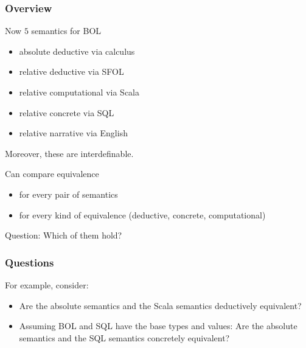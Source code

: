 \begin{frame}\frametitle{Overview}
Now $5$ semantics for BOL
\begin{itemize}
\item absolute deductive via calculus
\item relative deductive via SFOL
\item relative computational via Scala
\item relative concrete via SQL
\item relative narrative via English
\end{itemize}
Moreover, these are interdefinable.

Can compare equivalence
\begin{itemize}
\item for every pair of semantics
\item for every kind of equivalence (deductive, concrete, computational)
\end{itemize}
Question: Which of them hold?
\end{frame}

\begin{frame}\frametitle{Questions}
For example, consider:
\begin{itemize}
\item Are the absolute semantics and the Scala semantics deductively equivalent?
\item Assuming BOL and SQL have the base types and values:
Are the absolute semantics and the SQL semantics concretely equivalent?
\end{itemize}
\end{frame}

